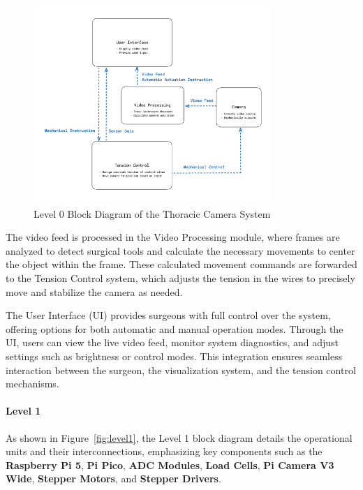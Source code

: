 \begin{figure}[H]
    \centering
    \includegraphics[width=0.8\textwidth]{images/level0.png}
    \caption{Level 0 Block Diagram of the Thoracic Camera System}
    \label{fig:level0}
\end{figure}

The video feed is processed in the Video Processing module, where frames are analyzed to detect surgical tools and calculate the necessary movements to center the object within the frame. These calculated movement commands are forwarded to the Tension Control system, which adjusts the tension in the wires to precisely move and stabilize the camera as needed.

The User Interface (UI) provides surgeons with full control over the system, offering options for both automatic and manual operation modes. Through the UI, users can view the live video feed, monitor system diagnostics, and adjust settings such as brightness or control modes. This integration ensures seamless interaction between the surgeon, the visualization system, and the tension control mechanisms.


\paragraph{Level 1}  
As shown in Figure~\ref{fig:level1}, the Level 1 block diagram details the operational units and their interconnections, emphasizing key components such as the \textbf{Raspberry Pi 5}, \textbf{Pi Pico}, \textbf{ADC Modules}, \textbf{Load Cells}, \textbf{Pi Camera V3 Wide}, \textbf{Stepper Motors}, and \textbf{Stepper Drivers}.

